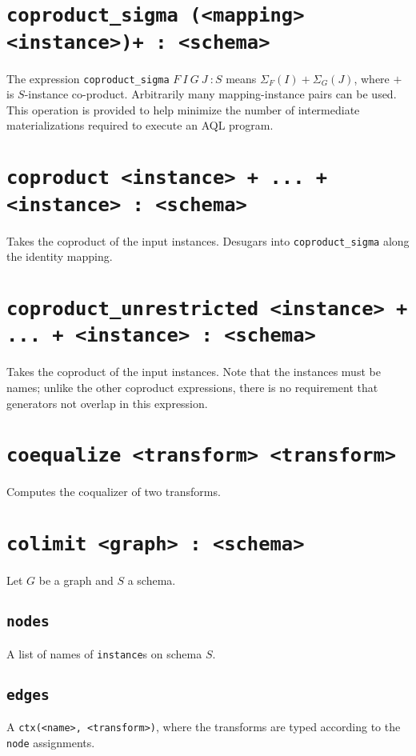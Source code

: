 \documentclass[10pt]{book}
\begin{document}
\section{{\tt coproduct\_sigma (<mapping> <instance>)+ : <schema>}}
The expression {\tt coproduct\_sigma}  $F \ I \ G \ J \ : S$ means $\Sigma_F(I) + \Sigma_G(J)$, where $+$ is $S$-instance co-product.  Arbitrarily many mapping-instance pairs can be used.  This operation is provided to help minimize the number of intermediate materializations required to execute an AQL program.

\section{{\tt coproduct <instance> + ... + <instance> : <schema>}}
Takes the coproduct of the input instances.  Desugars into {\tt coproduct\_sigma} along the identity mapping.

\section{{\tt coproduct\_unrestricted <instance> + ... + <instance> : <schema>}}
Takes the coproduct of the input instances.  Note that the instances must be names; unlike the other coproduct expressions, there is no requirement that generators not overlap in this expression.

\section{{\tt coequalize <transform> <transform>}}
Computes the coqualizer of two transforms.


\section{{\tt colimit <graph> : <schema>}}
Let $G$ be a graph and $S$ a schema.

\subsection{{\tt nodes}}
A list of names of {\tt instance}s on schema $S$.

\subsection{{\tt edges}}
A {\tt ctx(<name>, <transform>)}, where the transforms are typed according to the {\tt node} assignments.
\end{document}
